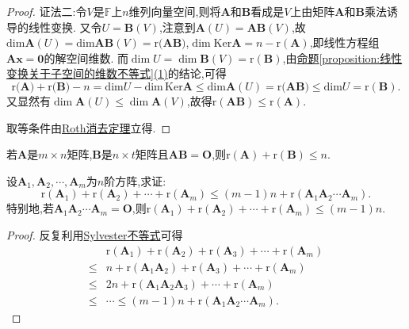 \documentclass[../../main.tex]{subfiles}%
\begin{document}
\begin{proof}
{\color{blue}证法二:}令\(V\)是\(\mathbb{F}\)上\(n\)维列向量空间,则将\(\boldsymbol{A}\)和\(\boldsymbol{B}\)看成是\(V\)上由矩阵\(\boldsymbol{A}\)和\(\boldsymbol{B}\)乘法诱导的线性变换. 又令\(U = \boldsymbol{B}(V)\),注意到\(\boldsymbol{A}(U)=\boldsymbol{A}\boldsymbol{B}(V)\),故\(\mathrm{dim}\boldsymbol{A}(U)=\mathrm{dim}\boldsymbol{AB}(V)=\mathrm{r(}\boldsymbol{AB})\),\(\dim\text{Ker}\boldsymbol{A}=n - \text{r}(\boldsymbol{A})\),即线性方程组\(\boldsymbol{A}\boldsymbol{x}=\boldsymbol{0}\)的解空间维数. 而\(\dim U=\dim\boldsymbol{B}(V)=\text{r}(\boldsymbol{B})\),由\hyperref[proposition:线性变换关于子空间的维数不等式]{命题\ref{proposition:线性变换关于子空间的维数不等式}(1)}的结论,可得
\[
\mathrm{r(}\boldsymbol{A})+\mathrm{r(}\boldsymbol{B})-n=\mathrm{dim}U-\mathrm{dim}\,\mathrm{Ker}\boldsymbol{A}\leqslant \mathrm{dim}\boldsymbol{A}\left( U \right) =\mathrm{r(}\boldsymbol{AB})\leqslant \mathrm{dim}U=\mathrm{r}\left( \boldsymbol{B} \right).
\]
又显然有\(\dim\boldsymbol{A}(U)\leqslant \dim\boldsymbol{A}(V)\),故得\(\text{r}(\boldsymbol{A}\boldsymbol{B})\leqslant \text{r}(\boldsymbol{A})\).

取等条件由\hyperref[theorem:Roth消去定理]{Roth消去定理}立得.
\end{proof}

\begin{corollary}\label{corollary:矩阵的秩不等式1}
若\(\boldsymbol{A}\)是\(m\times n\)矩阵,\(\boldsymbol{B}\)是\(n\times t\)矩阵且\(\boldsymbol{A}\boldsymbol{B}=\boldsymbol{O}\),则\(\mathrm{r}(\boldsymbol{A})+\mathrm{r}(\boldsymbol{B})\leqslant  n\).
\end{corollary}

\begin{proposition}[Sylvester不等式的推广]\label{proposition:Sylvester(西尔维斯特)不等式的推广}
设\(\boldsymbol{A}_1,\boldsymbol{A}_2,\cdots,\boldsymbol{A}_m\)为\(n\)阶方阵,求证:
\[
\mathrm{r}(\boldsymbol{A}_1)+\mathrm{r}(\boldsymbol{A}_2)+\cdots+\mathrm{r}(\boldsymbol{A}_m)\leqslant (m - 1)n+\mathrm{r}(\boldsymbol{A}_1\boldsymbol{A}_2\cdots\boldsymbol{A}_m).
\]
特别地,若\(\boldsymbol{A}_1\boldsymbol{A}_2\cdots\boldsymbol{A}_m=\boldsymbol{O}\),则\(\mathrm{r}(\boldsymbol{A}_1)+\mathrm{r}(\boldsymbol{A}_2)+\cdots+\mathrm{r}(\boldsymbol{A}_m)\leqslant (m - 1)n\).
\end{proposition}
\begin{proof}

反复利用\hyperref[proposition:Sylvester(西尔维斯特)不等式]{Sylvester不等式}可得
\begin{align*}
&\mathrm{r}(\boldsymbol{A}_1)+\mathrm{r}(\boldsymbol{A}_2)+\mathrm{r}(\boldsymbol{A}_3)+\cdots+\mathrm{r}(\boldsymbol{A}_m)\\
\leqslant &n+\mathrm{r}(\boldsymbol{A}_1\boldsymbol{A}_2)+\mathrm{r}(\boldsymbol{A}_3)+\cdots+\mathrm{r}(\boldsymbol{A}_m)\\
\leqslant &2n+\mathrm{r}(\boldsymbol{A}_1\boldsymbol{A}_2\boldsymbol{A}_3)+\cdots+\mathrm{r}(\boldsymbol{A}_m)\\
\leqslant &\cdots\leqslant (m - 1)n+\mathrm{r}(\boldsymbol{A}_1\boldsymbol{A}_2\cdots\boldsymbol{A}_m).
\end{align*}

\end{proof}
\end{document}
